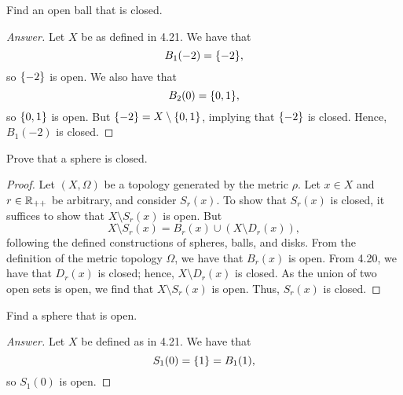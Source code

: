 \begin{minorEx}
    Find an open ball that is closed.
\end{minorEx}

\begin{proof}[Answer]
    Let $X$ be as defined in 4.21. We have that
    \[
        B_1(-2) = \{-2\},
    \]
    so $\{-2\}$ is open. We also have that 
    \[
        B_2(0) = \{0, 1\},
    \]
    so $\{0, 1\}$ is open. But $\{-2\} = X \setminus \{0, 1\}$, implying
    that $\{-2\}$ is closed. Hence, $B_1(-2)$ is closed.   
\end{proof}

\begin{minorEx}
    Prove that a sphere is closed.
\end{minorEx}

\begin{proof}
    Let $(X, \Omega)$ be a topology generated by the metric $\rho$. Let $x \in
    X$ and $r \in \mathbb{R}_{++}$ be arbitrary, and consider $S_{r}(x)$. To show that
    $S_{r}(x)$ is closed, it suffices to show that $X \setminus S_{r}(x)$ is
    open. But
    \[
        X \setminus S_{r}(x) = B_{r}(x) \cup (X \setminus D_{r}(x)),
    \]
    following the defined constructions of spheres, balls, and disks. From the
    definition of the metric topology $\Omega$, we have that $B_{r}(x)$ is open.
    From 4.20, we have that $D_{r}(x)$ is closed; hence, $X \setminus D_{r}(x)$
    is closed. As the union of two open sets is open, we find that $X \setminus
    S_{r}(x)$ is open. Thus, $S_{r}(x)$ is closed.
\end{proof}

\begin{minorEx}
    Find a sphere that is open.
\end{minorEx}

\begin{proof}[Answer]
    Let $X$ be defined as in 4.21. We have that 
    \[
        S_1(0) = \{1\} = B_1(1),
    \]
    so $S_1(0)$ is open.
\end{proof}
